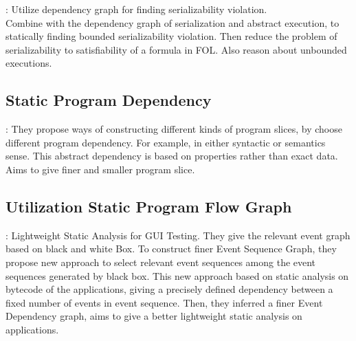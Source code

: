 \documentclass[a4paper,11pt]{article}
\begin{document}
\cite{nagar2018automated}: Utilize dependency graph for finding serializability violation. 
\\
Combine with the dependency graph of serialization and abstract execution, to statically finding bounded serializability violation. 
Then reduce the problem of serializability to satisfiability of a formula in FOL.
Also reason about unbounded executions.

\subsection{Static Program Dependency}

\cite{mastroeni2008data}: They propose ways of constructing different kinds of program slices, by choose different program dependency. For example, in either syntactic or semantics sense.
This abstract dependency is based on properties rather than exact data.
Aims to give finer and smaller program slice. 

\subsection{Utilization Static Program Flow Graph}

\cite{arlt2012lightweight}: Lightweight Static Analysis for GUI Testing. They give the relevant event graph based on black and white Box.
To construct finer Event Sequence Graph, 
they propose new approach to select relevant event sequences among the event sequences generated by black box.
This new approach based on static analysis on bytecode of the applications, 
giving a precisely defined dependency between a fixed number of events in event sequence.
Then, they inferred a finer Event Dependency graph, aims to give a better lightweight static analysis on applications.



\newpage


\end{document}
